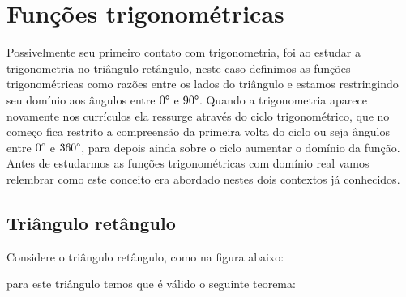 
\chapter{Funções trigonométricas}
 Possivelmente seu primeiro contato com trigonometria, foi ao estudar a trigonometria no triângulo retângulo, neste caso definimos as funções trigonométricas como razões entre os lados do triângulo e estamos restringindo seu domínio aos ângulos entre $0 \degree$ e $90 \degree$.
 Quando a trigonometria aparece novamente nos currículos ela ressurge através do ciclo trigonométrico, que no começo fica restrito a compreensão da primeira volta do ciclo ou seja ângulos entre $0 \degree$ e $360 \degree$, para depois ainda sobre o ciclo aumentar o domínio da função.
 Antes de estudarmos as funções trigonométricas com domínio real vamos relembrar como este conceito era abordado nestes dois contextos já conhecidos.
 
 \section{Triângulo retângulo}

  Considere o triângulo retângulo, como na figura abaixo:
  \begin{center}
  \end{center}
 para este triângulo temos que é válido o seguinte teorema:


